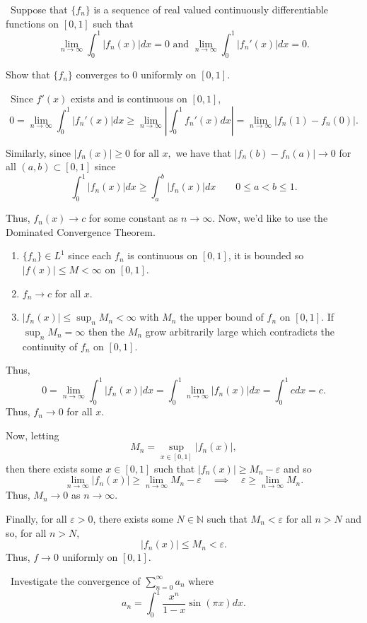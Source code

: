 \documentclass[12pt]{Homework}
\begin{document}
\begin{problem} $\,$
Suppose that $\{f_n\}$ is a sequence of real valued continuously differentiable functions on $[0,1]$ such that $$\lim_{n\to\infty}\int_0^1|f_n(x)|dx=0\text{ and }\lim_{n\to\infty}\int_0^1|f_n'(x)|dx=0.$$

Show that $\{f_n\}$ converges to $0$ uniformly on $[0,1]$.
\end{problem}


\begin{solution}$\,$
Since $f'(x)$ exists and is continuous on $[0,1]$, $$0=\lim_{n\to\infty}\int_0^1|f_n'(x)|dx\ge\lim_{n\to\infty}\left|\int_0^1f_n'(x)dx\right|=\lim_{n\to\infty}|f_n(1)-f_n(0)|.$$

Similarly, since $|f_n(x)|\ge0$ for all $x,$ we have that $|f_n(b)-f_n(a)|\to0$ for all $(a,b)\subset[0,1]$ since $$\int_0^1|f_n(x)|dx\ge\int_a^b|f_n(x)|dx\qquad 0\le a< b\le 1.$$

Thus, $f_n(x)\to c$ for some constant as $n\to\infty$. Now, we'd like to use the Dominated Convergence Theorem.
\begin{enumerate}
    \item $\{f_n\}\in L^1$ since each $f_n$ is continuous on $[0,1]$, it is bounded so $|f(x)|\le M<\infty$ on $[0,1]$.
    \item $f_n\to c$ for all $x$.
    \item $|f_n(x)|\le \sup_n M_n<\infty$ with $M_n$ the upper bound of $f_n$ on $[0,1]$. If $\sup_n M_n=\infty$ then the $M_n$ grow arbitrarily large which contradicts the continuity of $f_n$ on $[0,1]$.
\end{enumerate}

Thus, $$0=\lim_{n\to\infty}\int_0^1|f_n(x)|dx=\int_0^1\lim_{n\to\infty}|f_n(x)|dx=\int_0^1cdx=c.$$ Thus, $f_n\to 0$ for all $x$.

Now, letting $$M_n=\sup_{x\in[0,1]}|f_n(x)|,$$ then there exists some $x\in[0,1]$ such that $|f_n(x)|\ge M_n-\varepsilon$ and so $$\lim_{n\to\infty}|f_n(x)|\ge\lim_{n\to\infty}M_n-\varepsilon\quad\implies\quad\varepsilon\ge\lim_{n\to\infty}M_n.$$ Thus, $M_n\to0$ as $n\to\infty$.

Finally, for all $\varepsilon>0$, there exists some $N\in\mathbb{N}$ such that $M_n<\varepsilon$ for all $n>N$ and so, for all $n> N$, $$|f_n(x)|\le M_n<\varepsilon.$$ Thus, $f\to0$ uniformly on $[0,1]$.
\end{solution}
\newpage

\begin{problem} $\,$
Investigate the convergence of $\sum_{n=0}^\infty a_n$ where $$a_n=\int_0^1\frac{x^n}{1-x}\sin(\pi x)dx.$$
\end{problem}
\end{document}
